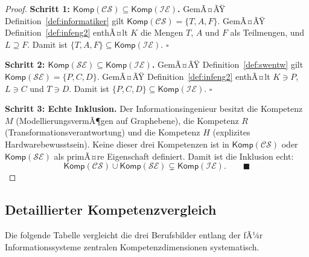 ﻿\documentclass[a4paper,12pt]{article}
\theoremstyle{definition}
\begin{document}
\begin{proof}
\textbf{Schritt 1: $\mathsf{Komp}(\mathcal{CS}) \subseteq \mathsf{Komp}(\mathcal{IE})$.}
GemÃ¤ÃŸ Definition~\ref{def:informatiker} gilt
$\mathsf{Komp}(\mathcal{CS}) = \{T, A, F\}$.
GemÃ¤ÃŸ Definition~\ref{def:infeng2} enthÃ¤lt $K$ die Mengen $T$, $A$ und $F$ als Teilmengen,
und $L \supseteq F$. Damit ist $\{T, A, F\} \subseteq \mathsf{Komp}(\mathcal{IE})$. $\square$

\textbf{Schritt 2: $\mathsf{Komp}(\mathcal{SE}) \subseteq \mathsf{Komp}(\mathcal{IE})$.}
GemÃ¤ÃŸ Definition~\ref{def:swentw} gilt
$\mathsf{Komp}(\mathcal{SE}) = \{P, C, D\}$.
GemÃ¤ÃŸ Definition~\ref{def:infeng2} enthÃ¤lt $K \ni P$, $L \ni C$ und $T \ni D$.
Damit ist $\{P, C, D\} \subseteq \mathsf{Komp}(\mathcal{IE})$. $\square$

\textbf{Schritt 3: Echte Inklusion.}
Der Informationsingenieur besitzt die Kompetenz $M$ (ModellierungsvermÃ¶gen auf Graphebene),
die Kompetenz $R$ (Transformationsverantwortung) und die Kompetenz $H$
(explizites Hardwarebewusstsein). Keine dieser drei Kompetenzen ist in
$\mathsf{Komp}(\mathcal{CS})$ oder $\mathsf{Komp}(\mathcal{SE})$ als primÃ¤re Eigenschaft
definiert. Damit ist die Inklusion echt:
\[
  \mathsf{Komp}(\mathcal{CS}) \cup \mathsf{Komp}(\mathcal{SE}) \subsetneq \mathsf{Komp}(\mathcal{IE}).
  \qquad \blacksquare
\]
\end{proof}

\subsection{Detaillierter Kompetenzvergleich}

Die folgende Tabelle vergleicht die drei Berufsbilder entlang der fÃ¼r
Informationssysteme zentralen Kompetenzdimensionen systematisch.
\end{document}
